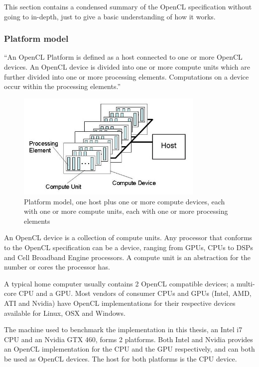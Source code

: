 This section contains a condensed summary of the OpenCL specification
without going to in-depth, just to give a basic understanding of how
it works.

\subsubsection{Platform model}

``An OpenCL Platform is defined as a host connected to one or more
OpenCL devices. An OpenCL device is divided into one or more compute
units which are further divided into one or more processing elements.
Computations on a device occur within the processing elements.''
\cite{cl-spec}

\begin{figure}
  \centering
  \includegraphics[width=0.8\textwidth]{images/platform-model.png}
  \caption{Platform model, one host plus one or more compute devices,
    each with one or more compute units, each with one or more
    processing elements}
  \label{platform-model-figure}
\end{figure}

An OpenCL device is a collection of compute units. Any processor that
conforms to the OpenCL specification can be a device, ranging from
GPUs, CPUs to DSPs and Cell Broadband Engine processors. A compute
unit is an abstraction for the number or cores the processor has.

A typical home computer usually contains 2 OpenCL compatible devices;
a multi-core CPU and a GPU. Most vendors of consumer CPUs and GPUs
(Intel, AMD, ATI and Nvidia) have OpenCL implementations for their
respective devices available for Linux, OSX and Windows.

The machine used to benchmark the implementation in this thesis, an
Intel i7 CPU and an Nvidia GTX 460, forms 2 platforms. Both Intel and
Nvidia provides an OpenCL implementation for the CPU and the GPU
respectively, and can both be used as OpenCL devices. The host for
both platforms is the CPU device.

